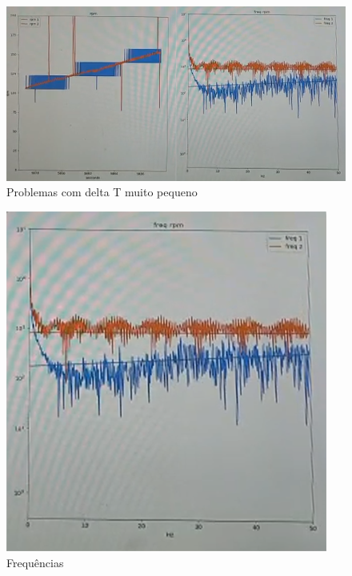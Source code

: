 	
	\begin{figure}[ht]
		\centering
		\includegraphics{figures/medidas_altas}
		\caption{Problemas com delta T muito pequeno}
		\label{fig:medidas_altas}
	\end{figure}
	
	\begin{figure}[ht]
		\centering
		\includegraphics{figures/frequencia_medidas_altas}
		\caption{Frequências}
		\label{fig:frequencia_medidas_altas}
	\end{figure}
	

